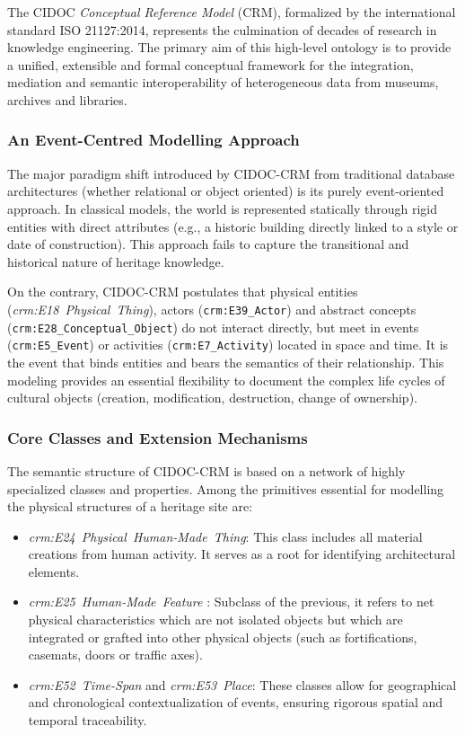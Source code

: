 \documentclass{article}
\begin{document}
The CIDOC \textit{Conceptual Reference Model} (CRM), formalized by the international standard ISO 21127:2014, represents the culmination of decades of research in knowledge engineering. The primary aim of this high-level ontology is to provide a unified, extensible and formal conceptual framework for the integration, mediation and semantic interoperability of heterogeneous data from museums, archives and libraries.

\subsubsection{An Event-Centred Modelling Approach}

The major paradigm shift introduced by CIDOC-CRM from traditional database architectures (whether relational or object oriented) is its purely event-oriented approach. In classical models, the world is represented statically through rigid entities with direct attributes (e.g., a historic building directly linked to a style or date of construction). This approach fails to capture the transitional and historical nature of heritage knowledge.

On the contrary, CIDOC-CRM postulates that physical entities (\textit{crm:E18\ Physical\ Thing}), actors (\texttt{crm:E39\_Actor}) and abstract concepts (\texttt{crm:E28\_Conceptual\_Object}) do not interact directly, but meet in events (\texttt{crm:E5\_Event}) or activities (\texttt{crm:E7\_Activity}) located in space and time. It is the event that binds entities and bears the semantics of their relationship. This modeling provides an essential flexibility to document the complex life cycles of cultural objects (creation, modification, destruction, change of ownership).

\subsubsection{Core Classes and Extension Mechanisms}

The semantic structure of CIDOC-CRM is based on a network of highly specialized classes and properties. Among the primitives essential for modelling the physical structures of a heritage site are:
\begin{itemize}
\item \textit{crm:E24\ Physical\ Human-Made\ Thing}: This class includes all material creations from human activity. It serves as a root for identifying architectural elements.
\item \textit{crm:E25\ Human-Made\ Feature} : Subclass of the previous, it refers to net physical characteristics which are not isolated objects but which are integrated or grafted into other physical objects (such as fortifications, casemats, doors or traffic axes).
\item \textit{crm:E52\ Time-Span} and \textit{crm:E53\ Place}: These classes allow for geographical and chronological contextualization of events, ensuring rigorous spatial and temporal traceability.
\end{itemize}
\end{document}
